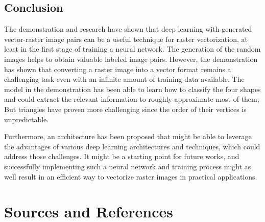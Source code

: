 \documentclass[12pt, a4paper, titlepage]{report}
\begin{document}
\pagebreak
\section{Conclusion}

The demonstration and research have shown that deep learning with generated vector-raster image pairs can be a useful technique for raster vectorization, at least in the first stage of training a neural network. The generation of the random images helps to obtain valuable labeled image pairs.
However, the demonstration has shown that converting a raster image into a vector format remains a challenging task even with an infinite amount of training data available. The model in the demonstration has been able to learn how to classify the four shapes and could extract the relevant information to roughly approximate most of them; But triangles have proven more challenging since the order of their vertices is unpredictable.

Furthermore, an architecture has been proposed that might be able to leverage the advantages of various deep learning architectures and techniques, which could address those challenges. It might be a starting point for future works, and successfully implementing such a neural network and training process might as well result in an efficient way to vectorize raster images in practical applications.






\chapter{Sources and References}

\nocite{*}  %

\begin{refcontext}[labelprefix=T]
   \printbibliography[type=misc, keyword={TextResource}, title={Text Sources and References}]
\end{refcontext}

\begin{refcontext}[labelprefix=I]
  \printbibliography[type=misc, keyword={ImageResource}, title={Image Resources}]
\end{refcontext}
\end{document}
